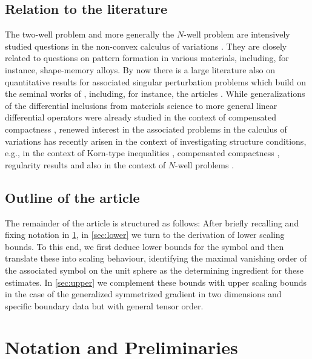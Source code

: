 \documentclass[a4paper, 10pt, twoside, notitlepage]{amsart}
\theoremstyle{plain}
\begin{document}
	
	
	\subsection{Relation to the literature}
	The two-well problem and more generally the $N$-well problem are intensively studied questions in the non-convex calculus of variations \cite{M1, DaM12, K1,KMS03, CK00,Ri18}. They are closely
	related to questions on pattern formation in various materials, including, for instance, shape-memory alloys. By now there is a large literature also on quantitative results for associated
	singular perturbation problems which build on the seminal works of \cite{KM92,KM94}, including, for instance, the articles \cite{AKKR22,CC15,CDMZ20,CZ16,CT05, CKZ17, CDPRZZ20, CO12, CO09,
		GZ23, KK11, KKO13,R16, RTZ19, RT22,RTrib22, RT23}.  While generalizations of the differential inclusions from materials science to more general linear differential operators were already
	studied in the context of compensated compactness \cite{T79,T93,T05,Mur81,FM99,Dac82}, renewed interest in the associated problems in the calculus of variations has recently arisen in the context of investigating
	structure conditions, e.g., in the context of Korn-type inequalities \cite{GLN22}, compensated compactness \cite{GR22, GRS22, KR22, Rai19}, regularity results \cite{CG22} and also in the context of $N$-well
	problems \cite{DPPR18,RRT23,ST23}.
	
	
	
	
	
	\subsection{Outline of the article}
	The remainder of the article is structured as follows: After briefly recalling and fixing notation in \cref{sec:notation}, in \cref{sec:lower} we turn to the derivation of lower
	scaling bounds. To this end, we first deduce lower bounds for the symbol and then translate these into scaling behaviour, identifying the maximal vanishing order of the associated symbol on the unit sphere as the determining ingredient
	for these estimates. In \cref{sec:upper} we complement these bounds with upper scaling bounds in the case of the generalized symmetrized gradient in two dimensions and specific boundary data but with general
	tensor order.
	
	
	
	\section{Notation and Preliminaries}
	\label{sec:notation}
	
\end{document}
